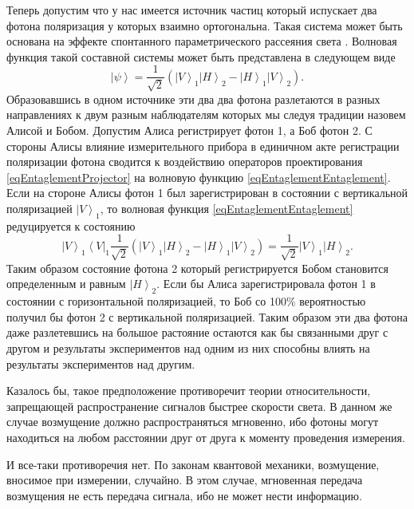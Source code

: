 Теперь допустим что у нас имеется источник частиц который испускает два фотона поляризация 
у которых взаимно ортогональна. Такая система может быть основана на эффекте спонтанного 
параметрического рассеяния света \cite{bKlishko}. Волновая функция такой составной системы 
может быть представлена в следующем виде
\begin{equation}
\left|\psi\right> = \frac{1}{\sqrt{2}}\left(
\left|V\right>_1\left|H\right>_2 - \left|H\right>_1\left|V\right>_2
\right).
\label{eqEntaglementEntaglement}
\end{equation}
Образовавшись в одном источнике эти два два фотона разлетаются в разных направлениях к двум разным
наблюдателям которых мы следуя традиции назовем Алисой и Бобом. Допустим Алиса регистрирует фотон 1, а 
Боб фотон 2. С стороны Алисы влияние измерительного прибора в единичном акте регистрации поляризации
фотона сводится к воздействию операторов проектирования \eqref{eqEntaglementProjector} на 
волновую функцию \eqref{eqEntaglementEntaglement}. Если на стороне Алисы фотон 1 был зарегистрирован в
состоянии с вертикальной поляризацией $\left|V\right>_1$, то волновая функция \eqref{eqEntaglementEntaglement}
редуцируется к состоянию
\begin{equation}
\left|V\right>_1\left<V\right|_1 
\frac{1}{\sqrt{2}} \left(
\left|V\right>_1\left|H\right>_2 - \left|H\right>_1\left|V\right>_2
\right) = \frac{1}{\sqrt{2}}
\left|V\right>_1\left|H\right>_2.
\nonumber
\end{equation}
Таким образом состояние фотона 2 который регистрируется Бобом становится определенным и равным $\left|H\right>_2$.
Если бы Алиса зарегистрировала фотон 1 в состоянии с горизонтальной поляризацией, то Боб со 100\% вероятностью 
получил бы фотон 2 с вертикальной поляризацией. Таким образом эти два фотона даже разлетевшись на большое 
растояние остаются как бы связанными друг с другом и результаты экспериментов
над одним из них способны влиять на результаты экспериментов над другим. 

Казалось бы, такое предположение противоречит теории относительности, запрещающей распространение сигналов быстрее скорости света. 
В данном же случае возмущение должно распространяться мгновенно, ибо фотоны могут находиться на любом расстоянии друг 
от друга к моменту проведения измерения.

И все-таки противоречия нет. По законам квантовой механики, возмущение, вносимое при измерении, случайно. В этом случае, мгновенная передача возмущения не есть передача сигнала, ибо не может нести информацию.

